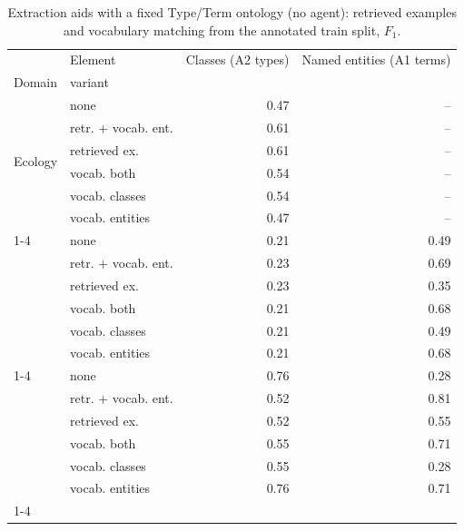 \begin{table}
\caption{Extraction aids with a fixed Type/Term ontology (no agent): retrieved examples and vocabulary matching from the annotated train split, $F_1$.}
\label{tab:onto_aids}
\begin{tabular}{llrr}
\toprule
 & Element & Classes (A2 types) & Named entities (A1 terms) \\
Domain & variant &  &  \\
\midrule
\multirow[t]{6}{*}{Ecology} & none & 0.47 & -- \\
 & retr. + vocab. ent. & 0.61 & -- \\
 & retrieved ex. & 0.61 & -- \\
 & vocab. both & 0.54 & -- \\
 & vocab. classes & 0.54 & -- \\
 & vocab. entities & 0.47 & -- \\
\cline{1-4}
\multirow[t]{6}{*}{Engineering} & none & 0.21 & 0.49 \\
 & retr. + vocab. ent. & 0.23 & 0.69 \\
 & retrieved ex. & 0.23 & 0.35 \\
 & vocab. both & 0.21 & 0.68 \\
 & vocab. classes & 0.21 & 0.49 \\
 & vocab. entities & 0.21 & 0.68 \\
\cline{1-4}
\multirow[t]{6}{*}{Scholarly} & none & 0.76 & 0.28 \\
 & retr. + vocab. ent. & 0.52 & 0.81 \\
 & retrieved ex. & 0.52 & 0.55 \\
 & vocab. both & 0.55 & 0.71 \\
 & vocab. classes & 0.55 & 0.28 \\
 & vocab. entities & 0.76 & 0.71 \\
\cline{1-4}
\bottomrule
\end{tabular}
\end{table}
